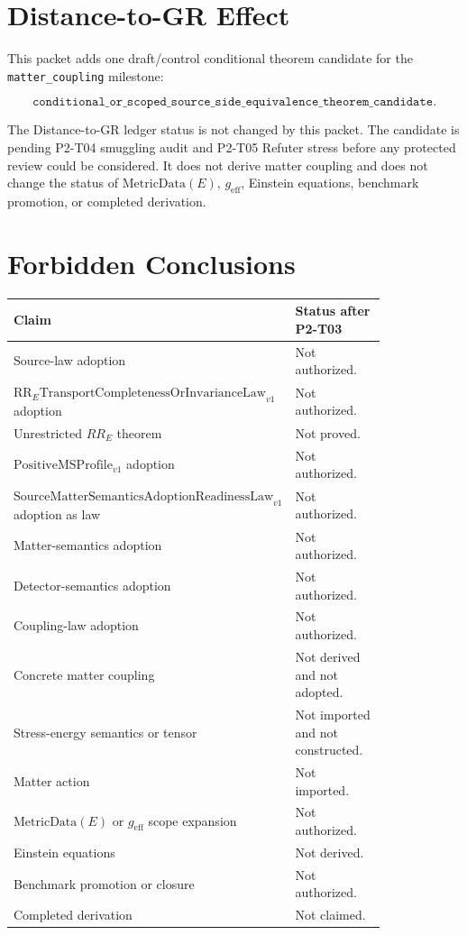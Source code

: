 \documentclass[11pt]{article}
\newcommand{\PositiveMSProfile}{\mathrm{PositiveMSProfile}_{v1}}
\newcommand{\SMSAR}{\mathrm{SourceMatterSemanticsAdoptionReadinessLaw}_{v1}}
\newcommand{\LawRR}{\mathrm{RR}_{E}\mathrm{TransportCompletenessOrInvarianceLaw}_{v1}}
\newcommand{\MetricData}{\mathrm{MetricData}}
\newcommand{\geff}{g_{\mathrm{eff}}}
\begin{document}
\section{Distance-to-GR Effect}

This packet adds one draft/control conditional theorem candidate for the
\texttt{matter\_coupling} milestone:

\[
  \texttt{conditional\_or\_scoped\_source\_side\_equivalence\_theorem\_candidate}.
\]

The Distance-to-GR ledger status is not changed by this packet. The candidate
is pending P2-T04 smuggling audit and P2-T05 Refuter stress before any
protected review could be considered. It does not derive matter coupling and
does not change the status of \(\MetricData(E)\), \(\geff\), Einstein
equations, benchmark promotion, or completed derivation.

\section{Forbidden Conclusions}

\begin{longtable}{p{0.34\linewidth}p{0.48\linewidth}}
\toprule
Claim & Status after P2-T03 \\
\midrule
Source-law adoption & Not authorized. \\
\(\LawRR\) adoption & Not authorized. \\
Unrestricted \(RR_E\) theorem & Not proved. \\
\(\PositiveMSProfile\) adoption & Not authorized. \\
\(\SMSAR\) adoption as law & Not authorized. \\
Matter-semantics adoption & Not authorized. \\
Detector-semantics adoption & Not authorized. \\
Coupling-law adoption & Not authorized. \\
Concrete matter coupling & Not derived and not adopted. \\
Stress-energy semantics or tensor & Not imported and not constructed. \\
Matter action & Not imported. \\
\(\MetricData(E)\) or \(\geff\) scope expansion & Not authorized. \\
Einstein equations & Not derived. \\
Benchmark promotion or closure & Not authorized. \\
Completed derivation & Not claimed. \\
\bottomrule
\end{longtable}
\end{document}
